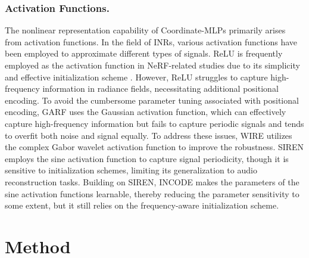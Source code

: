\documentclass[letterpaper]{article} %
\begin{document}
\subsubsection{Activation Functions.}
The nonlinear representation capability of Coordinate-MLPs primarily arises from activation functions. In the field of INRs, various activation functions have been employed to approximate different types of signals. ReLU is frequently employed as the activation function in NeRF-related studies due to its simplicity and effective initialization scheme \cite{mildenhall2020nerf, barron2022mipnerf360, yu2021pixelnerf, Chen2022tensorf}. However, ReLU struggles to capture high-frequency information in radiance fields, necessitating additional positional encoding. To avoid the cumbersome parameter tuning associated with positional encoding, GARF \cite{chng2022garf} uses the Gaussian activation function, which can effectively capture high-frequency information but fails to capture periodic signals and tends to overfit both noise and signal equally. To address these issues, WIRE \cite{saragadam2023wire} utilizes the complex Gabor wavelet activation function to improve the robustness. SIREN \cite{sitzmann2020siren} employs the sine activation function to capture signal periodicity, though it is sensitive to initialization schemes, limiting its generalization to audio reconstruction tasks. Building on SIREN, INCODE \cite{kazerouni2023incode} makes the parameters of the sine activation functions learnable, thereby reducing the parameter sensitivity to some extent, but it still relies on the frequency-aware initialization scheme.




\section{Method}
\end{document}
